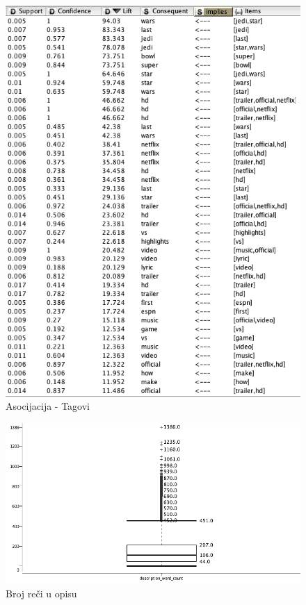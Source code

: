\documentclass[a4paper]{article}
\theoremstyle{definition}
\begin{document}
\begin{figure}[h!]
\begin{center}
    \includegraphics[width=1\textwidth]{association2.png}
    \caption{Asocijacija - Tagovi}
     \label{fig:asoc2}
\end{center}
\end{figure}



\begin{figure}[h!]
\begin{center}
    \includegraphics[width=1\textwidth]{box_desc_word_count.png}
    \caption{Broj reči u opisu}
    \label{fig:boxDesc}
\end{center}
\end{figure}
\end{document}
